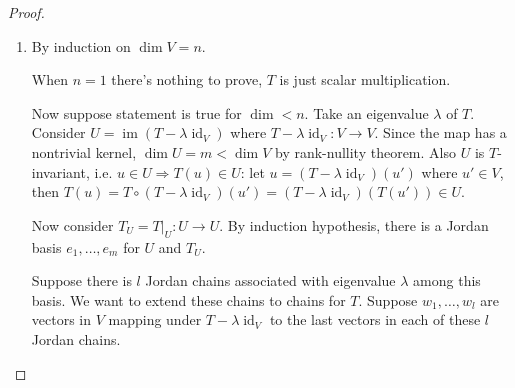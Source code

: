 \documentclass[a4paper]{article}
\newcommand{\id}{\operatorname{id}}
\newcommand{\im}{\operatorname{im}}
\theoremstyle{definition}
\begin{document}
\begin{proof}
\begin{enumerate}
    \item By induction on $\dim V=n$.
    
    When $n=1$ there's nothing to prove, $T$ is just scalar multiplication.
    
    Now suppose statement is true for $\dim < n$. Take an eigenvalue $\lambda$ of $T$. Consider $U=\im (T-\lambda \id_V)$ where $T-\lambda \id_V:V\rightarrow V$. Since the map has a nontrivial kernel, $\dim U=m<\dim V$ by rank-nullity theorem. Also $U$ is $T$-invariant, i.e. $u\in U \Rightarrow T(u)\in U$: let $u=(T-\lambda \id_V)(u')$ where $u' \in V$, then $T(u)=T\circ (T-\lambda \id_V)(u')=(T-\lambda \id_V) (T(u')) \in U$.
    
    Now consider $T_U=\left. T \right|_U : U\rightarrow U$. By induction hypothesis, there is a Jordan basis $e_1,\ldots,e_m$ for $U$ and $T_U$.
    
    Suppose there is $l$ Jordan chains associated with eigenvalue $\lambda$ among this basis. We want to extend these chains to chains for $T$. Suppose $w_1,\ldots,w_l$ are vectors in $V$ mapping under $T-\lambda \id_V$ to the last vectors in each of these $l$ Jordan chains.
    

\end{enumerate}
\end{proof}
\end{document}
